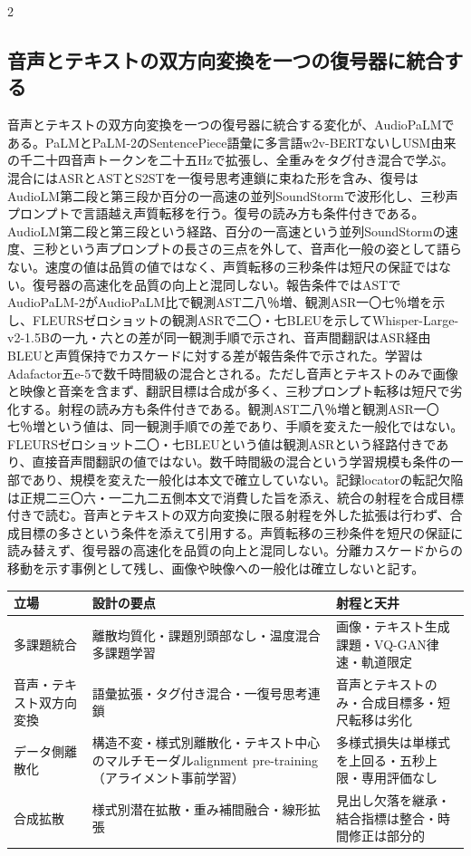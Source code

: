 \documentclass[lualatex,a4paper,10pt]{jlreq}
\begin{document}
\begin{multicols}{2}
\subsection{音声とテキストの双方向変換を一つの復号器に統合する}
音声とテキストの双方向変換を一つの復号器に統合する変化が、AudioPaLMである。PaLMとPaLM-2のSentencePiece語彙に多言語w2v-BERTないしUSM由来の千二十四音声トークンを二十五Hzで拡張し、全重みをタグ付き混合で学ぶ。混合にはASRとASTとS2STを一復号思考連鎖に束ねた形を含み、復号はAudioLM第二段と第三段か百分の一高速の並列SoundStormで波形化し、三秒声プロンプトで言語越え声質転移を行う\autocite{btd095}。復号の読み方も条件付きである。AudioLM第二段と第三段という経路、百分の一高速という並列SoundStormの速度、三秒という声プロンプトの長さの三点を外して、音声化一般の姿として語らない。速度の値は品質の値ではなく、声質転移の三秒条件は短尺の保証ではない。復号器の高速化を品質の向上と混同しない\autocite{btd095}。報告条件ではASTでAudioPaLM-2がAudioPaLM比で観測AST二八％増、観測ASR一〇七％増を示し、FLEURSゼロショットの観測ASRで二〇・七BLEUを示してWhisper-Large-v2-1.5Bの一九・六との差が同一観測手順で示され、音声間翻訳はASR経由BLEUと声質保持でカスケードに対する差が報告条件で示された。学習はAdafactor五e-5で数千時間級の混合とされる\autocite{btd095}。ただし音声とテキストのみで画像と映像と音楽を含まず、翻訳目標は合成が多く、三秒プロンプト転移は短尺で劣化する\autocite{btd095}。射程の読み方も条件付きである。観測AST二八％増と観測ASR一〇七％増という値は、同一観測手順での差であり、手順を変えた一般化ではない。FLEURSゼロショット二〇・七BLEUという値は観測ASRという経路付きであり、直接音声間翻訳の値ではない。数千時間級の混合という学習規模も条件の一部であり、規模を変えた一般化は本文で確立していない\autocite{btd095}。記録locatorの転記欠陥は正規二三〇六・一二九二五側本文で消費した旨を添え、統合の射程を合成目標付きで読む。音声とテキストの双方向変換に限る射程を外した拡張は行わず、合成目標の多さという条件を添えて引用する。声質転移の三秒条件を短尺の保証に読み替えず、復号器の高速化を品質の向上と混同しない。分離カスケードからの移動を示す事例として残し、画像や映像への一般化は確立しないと記す。
\end{multicols}

\begin{center}
\small
\begin{tabularx}{\textwidth}{@{}p{}p{}X@{}}
\toprule
立場 & 設計の要点 & 射程と天井 \\
\midrule
多課題統合 & 離散均質化・課題別頭部なし・温度混合多課題学習 & 画像・テキスト生成課題・VQ-GAN律速・軌道限定 \\
音声・テキスト双方向変換 & 語彙拡張・タグ付き混合・一復号思考連鎖 & 音声とテキストのみ・合成目標多・短尺転移は劣化 \\
データ側離散化 & 構造不変・様式別離散化・テキスト中心のマルチモーダルalignment pre-training（アライメント事前学習） & 多様式損失は単様式を上回る・五秒上限・専用評価なし \\
合成拡散 & 様式別潜在拡散・重み補間融合・線形拡張 & 見出し欠落を継承・結合指標は整合・時間修正は部分的 \\
\bottomrule
\end{tabularx}
\end{center}
\autocite{btd094,btd095,btd096,btd097}
\end{document}

